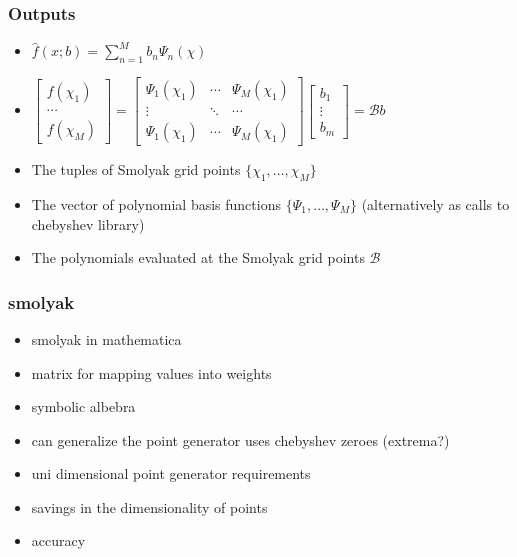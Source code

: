 \documentclass[handout]{beamer}
\begin{document}
\begin{frame}
  \frametitle{Outputs}
  \begin{itemize}
  \item $\hat{f}(x;b)=\sum_{n=1}^M b_n \Psi_n(\chi)$
  \item $
    \begin{bmatrix}
      f(\chi_1)\\ \cdots \\       f(\chi_M)
    \end{bmatrix}=
      \begin{bmatrix}
        \Psi_1(\chi_1) &\cdots &        \Psi_M(\chi_1)\\
\vdots&\ddots&\cdots\\
        \Psi_1(\chi_1)& \cdots   &      \Psi_M(\chi_1)
      \end{bmatrix}
      \begin{bmatrix}
        b_1\\ \vdots \\ b_m
      \end{bmatrix}= \mathcal{B} b
$
  \item The tuples of Smolyak grid points $\{\chi_1, \ldots , \chi_M\}$
  \item The vector of polynomial basis functions $\{\Psi_1, \ldots , \Psi_M\}$ (alternatively as calls to chebyshev library)
  \item The polynomials evaluated at the Smolyak grid points $\mathcal{B}$
  \end{itemize}
\end{frame}


\begin{frame}
  \frametitle{smolyak}

  \begin{itemize}
  \item smolyak in mathematica
  \item matrix for mapping values into weights
  \item symbolic albebra
  \item can generalize the point generator uses chebyshev zeroes (extrema?)
  \item uni dimensional point generator requirements
  \item savings in the dimensionality of points
  \item accuracy
  \end{itemize}
\end{frame}
\end{document}
